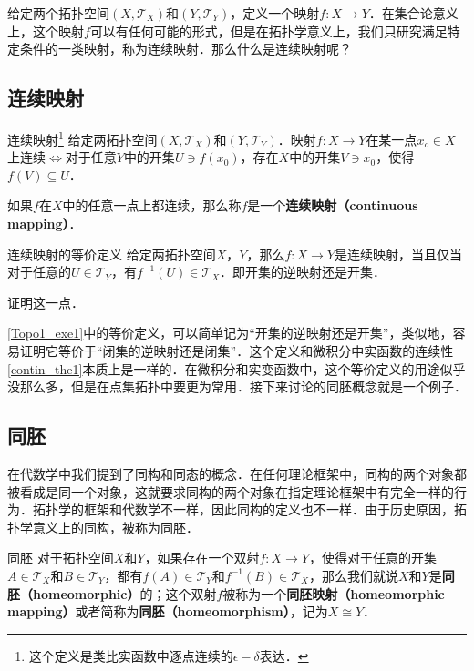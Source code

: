 
给定两个拓扑空间$(X, \mathcal{T}_X)$和$(Y, \mathcal{T}_Y)$，定义一个映射$f:X\rightarrow Y$．在集合论意义上，这个映射$f$可以有任何可能的形式，但是在拓扑学意义上，我们只研究满足特定条件的一类映射，称为连续映射．那么什么是连续映射呢？

\subsection{连续映射}
\begin{definition}{连续映射\footnote{这个定义是类比实函数中逐点连续的$\epsilon-\delta$表达．}}
给定两拓扑空间$(X, \mathcal{T}_X)$和$(Y, \mathcal{T}_Y)$．映射$f:X\rightarrow Y$在某一点$x_o\in X$上连续$\iff$对于任意$Y$中的开集$U\ni f(x_0)$，存在$X$中的开集$V\ni x_0$，使得$f(V)\subseteq U$．

如果$f$在$X$中的任意一点上都连续，那么称$f$是一个\textbf{连续映射（continuous mapping）}．
\end{definition}

\begin{exercise}{连续映射的等价定义}\label{Topo1_exe1}
给定两拓扑空间$X$，$Y$，那么$f:X\rightarrow Y$是连续映射，当且仅当对于任意的$U\in\mathcal{T}_Y$，有$f^{-1}(U)\in\mathcal{T}_X$．即开集的逆映射还是开集．

证明这一点．
\end{exercise}

\autoref{Topo1_exe1}中的等价定义，可以简单记为“开集的逆映射还是开集”，类似地，容易证明它等价于“闭集的逆映射还是闭集”．这个定义和微积分中实函数的连续性\autoref{contin_the1}本质上是一样的．在微积分和实变函数中，这个等价定义的用途似乎没那么多，但是在点集拓扑中要更为常用．接下来讨论的同胚概念就是一个例子．

\subsection{同胚}

在代数学中我们提到了同构和同态的概念．在任何理论框架中，同构的两个对象都被看成是同一个对象，这就要求同构的两个对象在指定理论框架中有完全一样的行为．拓扑学的框架和代数学不一样，因此同构的定义也不一样．由于历史原因，拓扑学意义上的同构，被称为同胚．

\begin{definition}{同胚}
对于拓扑空间$X$和$Y$，如果存在一个双射$f:X\rightarrow Y$，使得对于任意的开集$A\in\mathcal{T}_X$和$B\in\mathcal{T}_Y$，都有$f(A)\in\mathcal{T}_Y$和$f^{-1}(B)\in\mathcal{T}_X$，那么我们就说$X$和$Y$是\textbf{同胚（homeomorphic）}的；这个双射$f$被称为一个\textbf{同胚映射（homeomorphic mapping）}或者简称为\textbf{同胚（homeomorphism）}，记为$X\cong Y$．
\end{definition}

